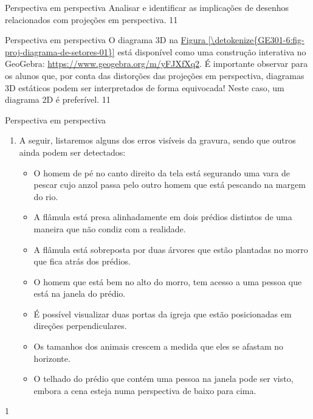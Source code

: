 \clearpage
\begin{objectives}{Perspectiva em perspectiva}
{
Analisar e identificar as implicações de desenhos relacionados com projeções em perspectiva.
}{1}{1}
\end{objectives}
\begin{sugestions}{Perspectiva em perspectiva}
{
O diagrama 3D na \hyperref[\detokenize{GE301-6:fig-proj-diagrama-de-setores-01}]{Figura \ref{\detokenize{GE301-6:fig-proj-diagrama-de-setores-01}}} está disponível como uma construção interativa no GeoGebra: \url{https://www.geogebra.org/m/yFJXfXq2}. É importante observar para os alunos que, por conta das distorções das projeções em perspectiva, diagramas 3D estáticos podem ser interpretados de forma equivocada! Neste caso, um diagrama 2D é preferível.
}{1}{1}
\end{sugestions}
\begin{answer}{Perspectiva em perspectiva}
{
\begin{enumerate}
\item A seguir, listaremos alguns dos erros visíveis da gravura, sendo que outros ainda podem ser detectados:
\begin{itemize}
\item {} 
O homem de pé no canto direito da tela está segurando uma vara de pescar cujo anzol passa pelo outro homem que está pescando na margem do rio.

\item {} 
A flâmula está presa alinhadamente em dois prédios distintos de uma maneira que não condiz com a realidade.

\item {} 
A flâmula está sobreposta por duas árvores que estão plantadas no morro que fica atrás dos prédios.

\item {} 
O homem que está bem no alto do morro, tem acesso a uma pessoa que está na janela do prédio.

\item {} 
É possível visualizar duas portas da igreja que estão posicionadas em direções perpendiculares.

\item {} 
Os tamanhos dos animais crescem a medida que eles se afastam no horizonte.

\item {} 
O telhado do prédio que contém uma pessoa na janela pode ser visto, embora a cena esteja numa perspectiva de baixo para cima.

\end{itemize}
\end{enumerate}
}{1}
\end{answer} 
